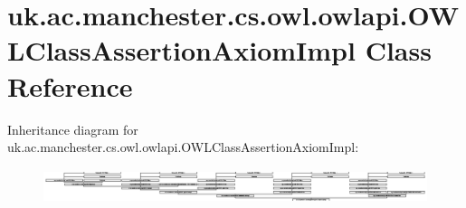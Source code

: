 \hypertarget{classuk_1_1ac_1_1manchester_1_1cs_1_1owl_1_1owlapi_1_1_o_w_l_class_assertion_axiom_impl}{\section{uk.\-ac.\-manchester.\-cs.\-owl.\-owlapi.\-O\-W\-L\-Class\-Assertion\-Axiom\-Impl Class Reference}
\label{classuk_1_1ac_1_1manchester_1_1cs_1_1owl_1_1owlapi_1_1_o_w_l_class_assertion_axiom_impl}
}
Inheritance diagram for uk.\-ac.\-manchester.\-cs.\-owl.\-owlapi.\-O\-W\-L\-Class\-Assertion\-Axiom\-Impl\-:\begin{figure}[H]
\begin{center}
\leavevmode
\includegraphics[height=1.020501cm]{classuk_1_1ac_1_1manchester_1_1cs_1_1owl_1_1owlapi_1_1_o_w_l_class_assertion_axiom_impl}
\end{center}
\end{figure}
